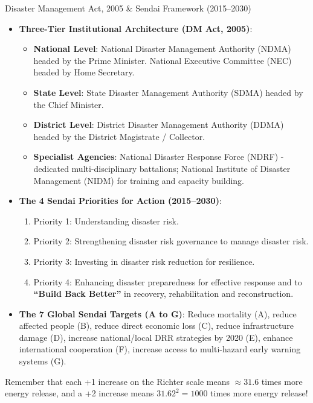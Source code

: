 \begin{lawbox}{Disaster Management Act, 2005 \& Sendai Framework (2015--2030)}
\begin{itemize}[leftmargin=1.2em]
    \item \textbf{Three-Tier Institutional Architecture (DM Act, 2005)}:
    \begin{itemize}
        \item \textbf{National Level}: National Disaster Management Authority (NDMA) headed by the Prime Minister. National Executive Committee (NEC) headed by Home Secretary.
        \item \textbf{State Level}: State Disaster Management Authority (SDMA) headed by the Chief Minister.
        \item \textbf{District Level}: District Disaster Management Authority (DDMA) headed by the District Magistrate / Collector.
        \item \textbf{Specialist Agencies}: National Disaster Response Force (NDRF) - dedicated multi-disciplinary battalions; National Institute of Disaster Management (NIDM) for training and capacity building.
    \end{itemize}
    \item \textbf{The 4 Sendai Priorities for Action (2015--2030)}:
    \begin{enumerate}
        \item Priority 1: Understanding disaster risk.
        \item Priority 2: Strengthening disaster risk governance to manage disaster risk.
        \item Priority 3: Investing in disaster risk reduction for resilience.
        \item Priority 4: Enhancing disaster preparedness for effective response and to \textbf{``Build Back Better''} in recovery, rehabilitation and reconstruction.
    \end{enumerate}
    \item \textbf{The 7 Global Sendai Targets (A to G)}: Reduce mortality (A), reduce affected people (B), reduce direct economic loss (C), reduce infrastructure damage (D), increase national/local DRR strategies by 2020 (E), enhance international cooperation (F), increase access to multi-hazard early warning systems (G).
\end{itemize}
\end{lawbox}

\begin{memorytip}
Remember that each +1 increase on the Richter scale means $\approx 31.6$ times more energy release, and a +2 increase means $31.62^2 = 1000$ times more energy release!
\end{memorytip}
